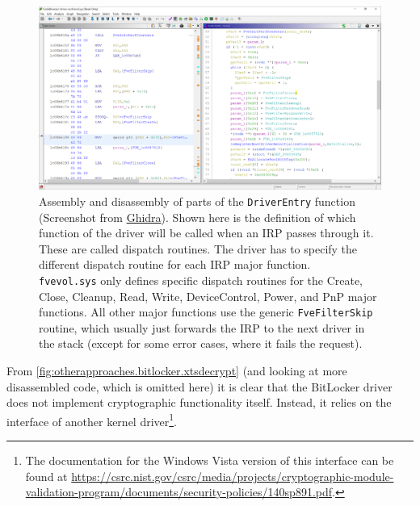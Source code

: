 \begin{figure}[htb!]
	\center
	\includegraphics[scale=0.39]{../img/otherapproaches.bitlocker.driverentry.png}
	\caption[
		Assembly and disassembly of parts of the \texttt{DriverEntry} function
	]{
		Assembly and disassembly of parts of the \texttt{DriverEntry} function (Screenshot from \href{https://www.ghidra-sre.org}{Ghidra}). Shown here is the definition of which function of the driver will be called when an IRP passes through it. These are called dispatch routines. The driver has to specify the different dispatch routine for each IRP major function. \\
		\texttt{fvevol.sys} only defines specific dispatch routines for the Create, Close, Cleanup, Read, Write, DeviceControl, Power, and PnP major functions. All other major functions use the generic \texttt{FveFilterSkip} routine, which usually just forwards the IRP to the next driver in the stack (except for some error cases, where it fails the request).
	}
	\label{fig:otherapproaches.bitlocker.driverentry}
\end{figure}

From \autoref{fig:otherapproaches.bitlocker.xtsdecrypt} (and looking at more disassembled code, which is omitted here) it is clear that the BitLocker driver does not implement cryptographic functionality itself. Instead, it relies on the interface of another kernel driver\footnote{\label{fn:otherapproaches.bitlocker.ksecdd} The documentation for the Windows Vista version of this interface can be found at \url{https://csrc.nist.gov/csrc/media/projects/cryptographic-module-validation-program/documents/security-policies/140sp891.pdf}.}.

